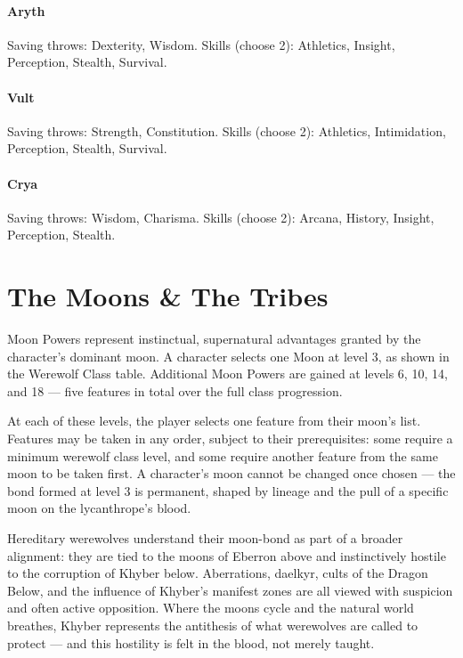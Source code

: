 \documentclass[twocolumn]{dndbook}
\begin{document}
\paragraph*{Aryth} Saving throws: Dexterity, Wisdom. Skills (choose 2): Athletics, Insight, Perception, Stealth, Survival.

\paragraph*{Vult} Saving throws: Strength, Constitution. Skills (choose 2): Athletics, Intimidation, Perception, Stealth, Survival.

\paragraph*{Crya} Saving throws: Wisdom, Charisma. Skills (choose 2): Arcana, History, Insight, Perception, Stealth.








\section*{The Moons \& The Tribes}

Moon Powers represent instinctual, supernatural advantages granted by the character's dominant moon.
A character selects one Moon at level 3, as shown in the Werewolf Class table. Additional Moon Powers are gained at levels 6, 10, 14, and 18 --- five features in total over the full class progression.\par

At each of these levels, the player selects one feature from their moon's list.
Features may be taken in any order, subject to their prerequisites: some require a minimum werewolf class level, and some require another feature from the same moon to be taken first.
A character's moon cannot be changed once chosen --- the bond formed at level 3 is permanent, shaped by lineage and the pull of a specific moon on the lycanthrope's blood.\par

Hereditary werewolves understand their moon-bond as part of a broader alignment: they are tied to the moons of Eberron above and instinctively hostile to the corruption of Khyber below.
Aberrations, daelkyr, cults of the Dragon Below, and the influence of Khyber's manifest zones are all viewed with suspicion and often active opposition.
Where the moons cycle and the natural world breathes, Khyber represents the antithesis of what werewolves are called to protect --- and this hostility is felt in the blood, not merely taught.
\end{document}
